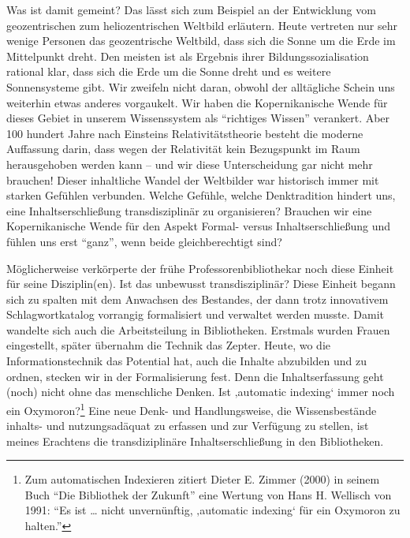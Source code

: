 Was ist damit gemeint? Das lässt sich zum Beispiel an der Entwicklung
vom geozentrischen zum heliozentrischen Weltbild erläutern. Heute
vertreten nur sehr wenige Personen das geozentrische Weltbild, dass sich
die Sonne um die Erde im Mittelpunkt dreht. Den meisten ist als Ergebnis
ihrer Bildungssozialisation rational klar, dass sich die Erde um die
Sonne dreht und es weitere Sonnensysteme gibt. Wir zweifeln nicht daran,
obwohl der alltägliche Schein uns weiterhin etwas anderes vorgaukelt.
Wir haben die Kopernikanische Wende für dieses Gebiet in unserem
Wissenssystem als \enquote{richtiges Wissen} verankert. Aber 100 hundert
Jahre nach Einsteins Relativitätstheorie besteht die moderne Auffassung
darin, dass wegen der Relativität kein Bezugspunkt im Raum herausgehoben
werden kann -- und wir diese Unterscheidung gar nicht mehr brauchen!
Dieser inhaltliche Wandel der Weltbilder war historisch immer mit
starken Gefühlen verbunden. Welche Gefühle, welche Denktradition hindert
uns, eine Inhaltserschließung transdisziplinär zu organisieren? Brauchen
wir eine Kopernikanische Wende für den Aspekt Formal- versus
Inhaltserschließung und fühlen uns erst \enquote{ganz}, wenn beide
gleichberechtigt sind?

Möglicherweise verkörperte der frühe Professorenbibliothekar noch diese
Einheit für seine Disziplin(en). Ist das unbewusst transdisziplinär?
Diese Einheit begann sich zu spalten mit dem Anwachsen des Bestandes,
der dann trotz innovativem Schlagwortkatalog vorrangig formalisiert und
verwaltet werden musste. Damit wandelte sich auch die Arbeitsteilung in
Bibliotheken. Erstmals wurden Frauen eingestellt, später übernahm die
Technik das Zepter. Heute, wo die Informationstechnik das Potential hat,
auch die Inhalte abzubilden und zu ordnen, stecken wir in der
Formalisierung fest. Denn die Inhaltserfassung geht (noch) nicht ohne
das menschliche Denken. Ist ‚automatic indexing` immer noch ein
Oxymoron?\footnote{Zum automatischen Indexieren zitiert Dieter E. Zimmer
  (2000) in seinem Buch \enquote{Die Bibliothek der Zukunft} eine
  Wertung von Hans H. Wellisch von 1991: \enquote{Es ist \ldots{} nicht
  unvernünftig, ‚automatic indexing` für ein Oxymoron zu halten.}} Eine
neue Denk- und Handlungsweise, die Wissensbestände inhalts- und
nutzungsadäquat zu erfassen und zur Verfügung zu stellen, ist meines
Erachtens die transdiziplinäre Inhaltserschließung in den Bibliotheken.


